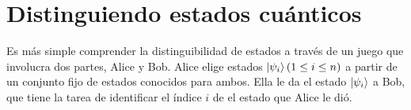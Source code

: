 

\section{Distinguiendo estados cuánticos}

Es más simple comprender la distinguibilidad de estados a través de un juego que involucra dos partes, Alice y Bob. Alice elige estados $\ket{\psi_i} (1 \leq i \leq n)$
a partir de un conjunto fijo de estados conocidos para ambos. Ella le da el estado $\ket{\psi_i}$ a Bob, que tiene la tarea de identificar el índice $i$ de el estado que Alice le dió.

